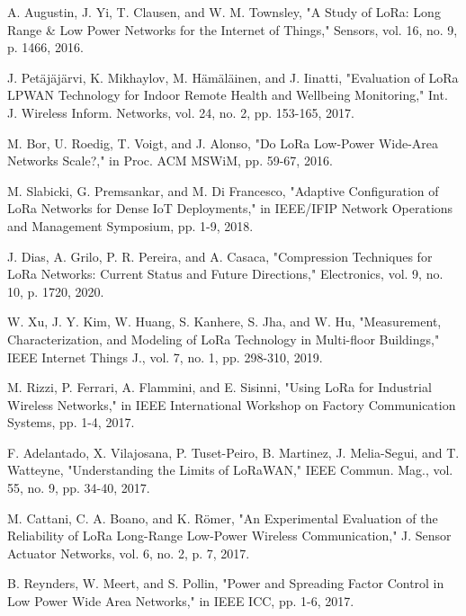 \documentclass[conference]{IEEEtran}
\begin{document}
\begin{thebibliography}{00}
 A. Augustin, J. Yi, T. Clausen, and W. M. Townsley, "A Study of LoRa: Long Range \& Low Power Networks for the Internet of Things," Sensors, vol. 16, no. 9, p. 1466, 2016.

 J. Petäjäjärvi, K. Mikhaylov, M. Hämäläinen, and J. Iinatti, "Evaluation of LoRa LPWAN Technology for Indoor Remote Health and Wellbeing Monitoring," Int. J. Wireless Inform. Networks, vol. 24, no. 2, pp. 153-165, 2017.

 M. Bor, U. Roedig, T. Voigt, and J. Alonso, "Do LoRa Low-Power Wide-Area Networks Scale?," in Proc. ACM MSWiM, pp. 59-67, 2016.

 M. Slabicki, G. Premsankar, and M. Di Francesco, "Adaptive Configuration of LoRa Networks for Dense IoT Deployments," in IEEE/IFIP Network Operations and Management Symposium, pp. 1-9, 2018.

 J. Dias, A. Grilo, P. R. Pereira, and A. Casaca, "Compression Techniques for LoRa Networks: Current Status and Future Directions," Electronics, vol. 9, no. 10, p. 1720, 2020.

 W. Xu, J. Y. Kim, W. Huang, S. Kanhere, S. Jha, and W. Hu, "Measurement, Characterization, and Modeling of LoRa Technology in Multi-floor Buildings," IEEE Internet Things J., vol. 7, no. 1, pp. 298-310, 2019.

 M. Rizzi, P. Ferrari, A. Flammini, and E. Sisinni, "Using LoRa for Industrial Wireless Networks," in IEEE International Workshop on Factory Communication Systems, pp. 1-4, 2017.

 F. Adelantado, X. Vilajosana, P. Tuset-Peiro, B. Martinez, J. Melia-Segui, and T. Watteyne, "Understanding the Limits of LoRaWAN," IEEE Commun. Mag., vol. 55, no. 9, pp. 34-40, 2017.

 M. Cattani, C. A. Boano, and K. Römer, "An Experimental Evaluation of the Reliability of LoRa Long-Range Low-Power Wireless Communication," J. Sensor Actuator Networks, vol. 6, no. 2, p. 7, 2017.

 B. Reynders, W. Meert, and S. Pollin, "Power and Spreading Factor Control in Low Power Wide Area Networks," in IEEE ICC, pp. 1-6, 2017.
\end{thebibliography}
\end{document}
